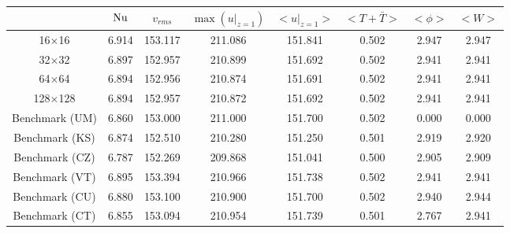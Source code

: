 \begin{tabular}{c|ccccccc}
    & $\mathrm{Nu}$ & $v_{rms}$ & $\max(u|_{z=1})$ & $<u|_{z=1}>$ & $<T + \bar{T}>$ & $<\phi>$ & $<W>$ \\
\hline
16$\times$16 & 6.914 & 153.117 & 211.086 & 151.841 & 0.502 & 2.947 & 2.947 \\
32$\times$32 & 6.897 & 152.957 & 210.899 & 151.692 & 0.502 & 2.941 & 2.941 \\
64$\times$64 & 6.894 & 152.956 & 210.874 & 151.691 & 0.502 & 2.941 & 2.941 \\
128$\times$128 & 6.894 & 152.957 & 210.872 & 151.692 & 0.502 & 2.941 & 2.941 \\
\hline
Benchmark (UM) & 6.860 & 153.000 & 211.000 & 151.700 & 0.502 & 0.000 & 0.000 \\
Benchmark (KS) & 6.874 & 152.510 & 210.280 & 151.250 & 0.501 & 2.919 & 2.920 \\
Benchmark (CZ) & 6.787 & 152.269 & 209.868 & 151.041 & 0.500 & 2.905 & 2.909 \\
Benchmark (VT) & 6.895 & 153.394 & 210.966 & 151.738 & 0.502 & 2.941 & 2.941 \\
Benchmark (CU) & 6.880 & 153.100 & 210.900 & 151.700 & 0.502 & 2.940 & 2.944 \\
Benchmark (CT) & 6.855 & 153.094 & 210.954 & 151.739 & 0.501 & 2.767 & 2.941 \\
\end{tabular}
